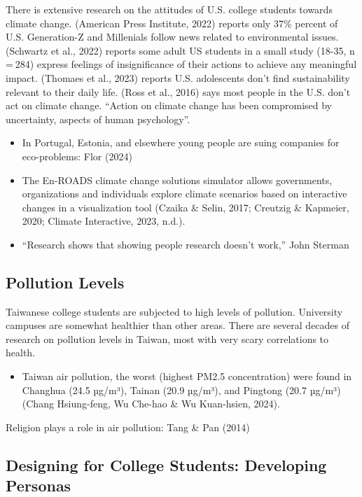 \documentclass[
  letterpaper,
  DIV=11,
  numbers=noendperiod]{scrartcl}
\providecommand{\tightlist}{%
  \setlength{\itemsep}{0pt}\setlength{\parskip}{0pt}}\usepackage{longtable,booktabs,array}
\begin{document}
There is extensive research on the attitudes of U.S. college students
towards climate change. (American Press Institute, 2022) reports only
37\% percent of U.S. Generation-Z and Millenials follow news related to
environmental issues. (Schwartz et al., 2022) reports some adult US
students in a small study (18-35, n = 284) express feelings of
insignificance of their actions to achieve any meaningful impact.
(Thomaes et al., 2023) reports U.S. adolescents don't find
sustainability relevant to their daily life. (Ross et al., 2016) says
most people in the U.S. don't act on climate change. ``Action on climate
change has been compromised by uncertainty, aspects of human
psychology''.

\begin{itemize}
\item
  In Portugal, Estonia, and elsewhere young people are suing companies
  for eco-problems: Flor (2024)
\item
  The En-ROADS climate change solutions simulator allows governments,
  organizations and individuals explore climate scenarios based on
  interactive changes in a visualization tool (Czaika \& Selin, 2017;
  Creutzig \& Kapmeier, 2020; Climate Interactive, 2023, n.d.).
\item
  ``Research shows that showing people research doesn't work,'' John
  Sterman
\end{itemize}

\subsection{Pollution Levels}\label{pollution-levels}

Taiwanese college students are subjected to high levels of pollution.
University campuses are somewhat healthier than other areas. There are
several decades of research on pollution levels in Taiwan, most with
very scary correlations to health.

\begin{itemize}
\tightlist
\item
  Taiwan air pollution, the worst (highest PM2.5 concentration) were
  found in Changhua (24.5 µg/m³), Tainan (20.9 µg/m³), and Pingtong
  (20.7 µg/m³) (Chang Hsiung-feng, Wu Che-hao \& Wu Kuan-hsien, 2024).
\end{itemize}

Religion plays a role in air pollution: Tang \& Pan (2014)

\subsection{Designing for College Students: Developing
Personas}\label{designing-for-college-students-developing-personas}
\end{document}
